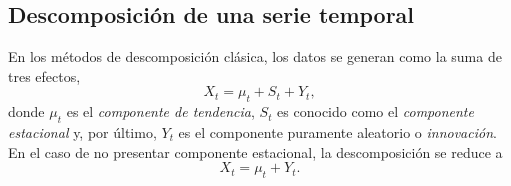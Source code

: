 \documentclass[12pt,twoside]{article}
\newtheorem{proposition}[theorem]{Proposición}
\newtheorem{proof}[theorem]{Demostración.}
\renewenvironment{proof}{\texttt{Demostración.}} {\quad \hfill $\blacksquare$ \newline} %
\newcommand{\abs}[1]{\ensuremath{|#1|}}
\begin{document}
            





\subsection{Descomposición de una serie temporal}
En los métodos de descomposición clásica, los datos se generan como la suma de tres efectos,
\begin{equation}\label{eq:descom}
    X_t = \mu_t + S_t + Y_t,
\end{equation}
donde $\mu_t$ es el \emph{componente de tendencia}, $S_t$ es conocido como el \emph{componente estacional} y, por último, $Y_t$ es el componente puramente aleatorio o \emph{innovación}. En el caso de no presentar componente estacional, la descomposición se reduce a 
\begin{equation}\label{eq:descom2}
    X_t = \mu_t + Y_t.
\end{equation}
\end{document}
